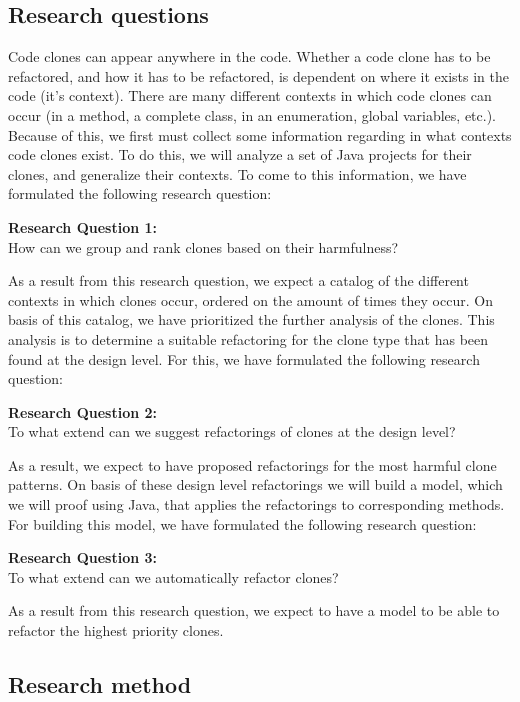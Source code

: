 \subsection{Research questions}
Code clones can appear anywhere in the code. Whether a code clone has to be refactored, and how it has to be refactored, is dependent on where it exists in the code (it's context). There are many different contexts in which code clones can occur (in a method, a complete class, in an enumeration, global variables, etc.). Because of this, we first must collect some information regarding in what contexts code clones exist. To do this, we will analyze a set of Java projects for their clones, and generalize their contexts. To come to this information, we have formulated the following research question:
\begin{displayquote}
\textbf{Research Question 1:}\\How can we group and rank clones based on their harmfulness?
\end{displayquote}
As a result from this research question, we expect a catalog of the different contexts in which clones occur, ordered on the amount of times they occur. On basis of this catalog, we have prioritized the further analysis of the clones. This analysis is to determine a suitable refactoring for the clone type that has been found at the design level. For this, we have formulated the following research question:
\begin{displayquote}
\textbf{Research Question 2:}\\To what extend can we suggest refactorings of clones at the design level?
\end{displayquote}
As a result, we expect to have proposed refactorings for the most harmful clone patterns. On basis of these design level refactorings we will build a model, which we will proof using Java, that applies the refactorings to corresponding methods. For building this model, we have formulated the following research question:
\begin{displayquote}
\textbf{Research Question 3:}\\To what extend can we automatically refactor clones?
\end{displayquote}
As a result from this research question, we expect to have a model to be able to refactor the highest priority clones.

\subsection{Research method}

